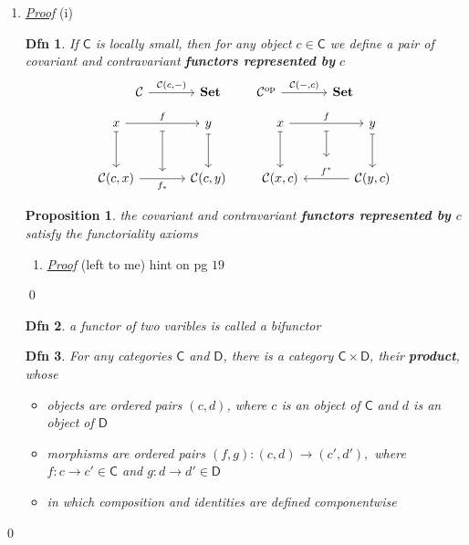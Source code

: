 \documentclass{article}
\theoremstyle{spacious}
\newtheorem*{dfn}{Dfn}
\newtheorem*{prp}{Proposition}
\newenvironment{pf}{\begin{enumerate} \item[] \textit{\underline{Proof}} }{\end{enumerate}\qed}
\renewcommand{\:}{\vcentcolon=} %
\begin{document}
\begin{pf}{(i)}
\begin{dfn} If \(\mathsf{C}\) is locally small, then for any object \(c \in \mathsf{C}\) we define a pair of covariant and contravariant \textbf{functors represented by} \(c\)
\[
\begin{tikzcd}[column sep=large]
\mathcal{C} \arrow[r, "{\mathcal{C}(c,-)}"] & \mathbf{Set}
\end{tikzcd}
\qquad
\begin{tikzcd}[column sep=large]
\mathcal{C}^{\mathrm{op}} \arrow[r, "{\mathcal{C}(-,c)}"] & \mathbf{Set}
\end{tikzcd}
\]
    \[
\begin{tikzcd}[row sep=large, column sep=large]
x & y \\
{\mathcal{C}(c,x)} & {\mathcal{C}(c,y)}
\arrow[mapsto, from=1-1, to=2-1]
\arrow[mapsto, from=1-2, to=2-2]
\arrow["{f}"{name=F}, from=1-1, to=1-2]
\arrow["{f_\ast}"'{name=G}, from=2-1, to=2-2]
\arrow[mapsto, from=F, to=G, shorten <=.6em, shorten >=.6em]
\end{tikzcd}
\qquad
\begin{tikzcd}[row sep=large, column sep=large]
x & y \\
{\mathcal{C}(x,c)} & {\mathcal{C}(y,c)}
\arrow[mapsto, from=1-1, to=2-1]
\arrow[mapsto, from=1-2, to=2-2]
\arrow["{f}"{name=F}, from=1-1, to=1-2]
\arrow["{f^\ast}"{name=H}, from=2-2, to=2-1, swap]
\arrow[mapsto, from=F, to=H, shorten <=.6em, shorten >=.6em]
\end{tikzcd}
\]

\end{dfn}

\begin{prp}  the covariant and contravariant \textbf{functors represented by \(c\)} satisfy the functoriality axioms
    
\end{prp}

\begin{pf}
    (left to me) hint on pg $19$
\end{pf}

\begin{dfn} a functor of two varibles is called a bifunctor
\end{dfn}

\begin{dfn} For any categories \(\mathsf{C}\) and \(\mathsf{D}\), there is a category \(\mathsf{C}\times\mathsf{D}\), their \textbf{product}, whose 
\begin{itemize}
    \item objects are ordered pairs \(\left(c,d\right)\), where \(c\) is an object of \(\mathsf{C}\) and \(d\) is an object of \(\mathsf{D}\)
    \item morphisms are ordered pairs \(\left(f,g\right):\left(c,d\right)\to \left(c',d'\right),\) where \(f:c\to c' \in \mathsf{C}\) and \(g:d\to d' \in \mathsf{D}\)
    \item in which composition and identities are defined componentwise
\end{itemize}
\end{dfn}


\end{pf}
\end{document}

